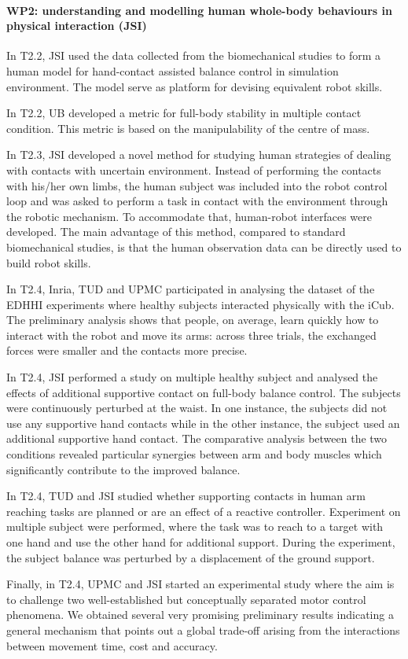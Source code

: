 






 
\paragraph*{WP2: understanding and modelling human whole-body behaviours in physical interaction (JSI)}
In T2.2, JSI used the data collected from the biomechanical studies to form a human model for hand-contact assisted balance control in simulation environment. The model serve as platform for devising equivalent robot skills.

In T2.2, UB developed a metric for full-body stability in multiple contact condition. This metric is based on the manipulability of the centre of mass.

In T2.3, JSI developed a novel method for studying human strategies of dealing with contacts with uncertain environment. Instead of performing the contacts with his/her own limbs, the human subject was included into the robot control loop and was asked to perform a task in contact with the environment through the robotic mechanism. To accommodate that, human-robot interfaces were developed. The main advantage of this method, compared to standard biomechanical studies, is that the human observation data can be directly used to build robot skills.

In T2.4, Inria, TUD and UPMC participated in analysing the dataset of the EDHHI experiments where healthy subjects interacted physically with the iCub. The preliminary analysis shows that people, on average, learn quickly how to interact with the robot and move its arms: across three trials, the exchanged forces were smaller and the contacts more precise.

In T2.4, JSI performed a study on multiple healthy subject and analysed the effects of additional supportive contact on full-body balance control. The subjects were continuously perturbed at the waist. In one instance, the subjects did not use any supportive hand contacts while in the other instance, the subject used an additional supportive hand contact. The comparative analysis between the two conditions revealed particular synergies between arm and body muscles which significantly contribute to the improved balance.

In T2.4, TUD and JSI studied whether supporting contacts in human arm reaching tasks are planned or are an effect of a reactive controller. Experiment on multiple subject were performed, where the task was to reach to a target with one hand and use the other hand for additional support. During the experiment, the subject balance was perturbed by a displacement of the ground support.

Finally, in T2.4, UPMC and JSI started an experimental study where the aim is to challenge two well-established but conceptually separated motor control phenomena. We obtained several very promising preliminary results indicating a general mechanism that points out a global trade-off arising from the interactions between movement time, cost and accuracy.
